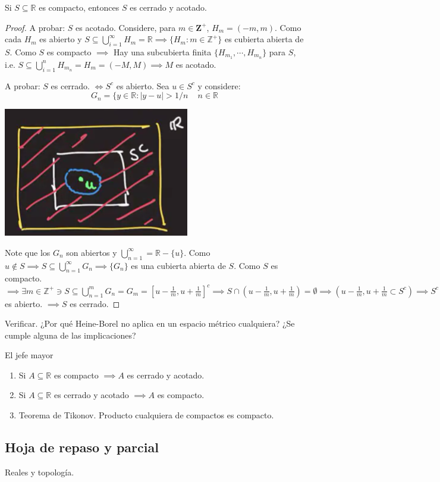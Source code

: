 \begin{teorema}
	Si $S\subseteq \mathbb{R}$ es compacto, entonces $S$ es cerrado y acotado. 
	\begin{proof}
		A probar: $S$ es acotado. Considere, para $m\in \mathbf{Z}^+$, $H_m=(-m,m)$. Como cada $H_m$ es abierto y $S\subseteq \bigcup_{i=1}^\infty H_m=\mathbb{R}\implies \{H_m:m\in\mathbb{Z}^+\}$ es cubierta abierta de $S$. Como $S$ es compacto $\implies$ Hay una subcubierta finita $\{H_{m_1},\cdots, H_{m_n}\}$ para $S$, i.e. $S\subseteq \bigcup_{i=1}^n H_{m_n}=H_m=(-M,M)\implies M$ es acotado. \newline 
		
		A probar: $S$ es cerrado. $\iff S^c$ es abierto. Sea $u\in S^c$ y considere:
	$$G_n=\{y\in\mathbb{R}: |y-u|>1/n\, \quad n\in \mathbb{R}$$
	\begin{center}
	\includegraphics[scale=0.6]{images/2/27}
\end{center}
Note que los $G_n$ son abiertos y $\bigcup_{n=1}^\infty =\mathbb{R}-\{u\}$. Como $u\not\in S\implies S\subseteq \bigcup_{n=1}^{\infty} G_n\implies \{G_n\}$ es una cubierta abierta de $S$. Como $S$ es compacto. $\implies \exists m\in \mathbb{Z}^+\ni S\subseteq \bigcup_{n=1}^m G_n=G_m=\left[u-\frac{1}{m}, u+\frac{1}{m}\right]^c\implies S\cap \left(u-\frac{1}{m}, u+\frac{1}{m}\right)=\emptyset\implies \left(u-\frac{1}{m}, u+\frac{1}{m}\subset S^c\right)\implies S^c$ es abierto. $\implies S$ es cerrado. 
	\end{proof}
\end{teorema}

\begin{cajita}{Verificar.}
	¿Por qué Heine-Borel no aplica en un espacio métrico cualquiera? ¿Se cumple alguna de las implicaciones?
\end{cajita}

\begin{teorema} El jefe mayor
	\begin{enumerate}
		\item Si $A\subseteq \mathbb{R}$ es compacto $\implies A$ es cerrado y acotado. 
		\item Si $A\subseteq \mathbb{R}$ es cerrado y acotado $\implies A$ es compacto. 
		\item Teorema de Tikonov. Producto cualquiera de compactos es compacto. 
	\end{enumerate}
\end{teorema}

\subsection{Hoja de repaso y parcial}

Reales y topología. 




